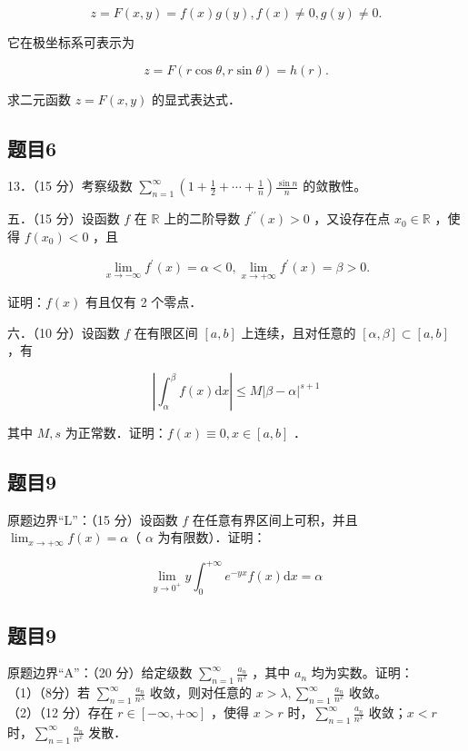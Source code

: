 \documentclass{article}
\begin{document}
\[
z=F(x, y)=f(x) g(y), f(x) \neq 0, g(y) \neq 0 .
\]

它在极坐标系可表示为

\[
z=F(r \cos \theta, r \sin \theta)=h(r) .
\]

求二元函数 \(z=F(x, y)\) 的显式表达式．\\

\subsection{题目6}
13．（15 分）考察级数 \(\sum_{n=1}^{\infty}\left(1+\frac{1}{2}+\cdots+\frac{1}{n}\right) \frac{\sin n}{n}\) 的敛散性。

五．（15 分）设函数 \(f\) 在 \(\mathbb{R}\) 上的二阶导数 \(f^{\prime \prime}(x)>0\) ，又设存在点 \(x_{0} \in \mathbb{R}\) ，使得 \(f\left(x_{0}\right)<0\) ，且

\[
\lim _{x \rightarrow-\infty} f^{\prime}(x)=\alpha<0, \lim _{x \rightarrow+\infty} f^{\prime}(x)=\beta>0 .
\]

证明：\(f(x)\) 有且仅有 2 个零点．

六．（10 分）设函数 \(f\) 在有限区间 \([a, b]\) 上连续，且对任意的 \([\alpha, \beta] \subset[a, b]\) ，有

\[
\left|\int_{\alpha}^{\beta} f(x) \mathrm{d} x\right| \leq M|\beta-\alpha|^{s+1}
\]

其中 \(M, s\) 为正常数．证明：\(f(x) \equiv 0, x \in[a, b]\) ．\\

\subsection{题目9}
原题边界“L”：（15 分）设函数 \(f\) 在任意有界区间上可积，并且 \(\lim _{x \rightarrow+\infty} f(x)=\alpha\)（ \(\alpha\) 为有限数）．证明：

\[
\lim _{y \rightarrow 0^{+}} y \int_{0}^{+\infty} e^{-y x} f(x) \mathrm{d} x=\alpha
\]

\subsection{题目9}
原题边界“A”：（20 分）给定级数 \(\sum_{n=1}^{\infty} \frac{a_{n}}{n^{x}}\) ，其中 \(a_{n}\) 均为实数。证明：\\
（1）（8分）若 \(\sum_{n=1}^{\infty} \frac{a_{n}}{n^{\lambda}}\) 收敛，则对任意的 \(x>\lambda, \sum_{n=1}^{\infty} \frac{a_{n}}{n^{x}}\) 收敛。\\
（2）（12 分）存在 \(r \in[-\infty,+\infty]\) ，使得 \(x>r\) 时，\(\sum_{n=1}^{\infty} \frac{a_{n}}{n^{x}}\) 收敛；\(x<r\) 时，\(\sum_{n=1}^{\infty} \frac{a_{n}}{n^{x}}\) 发散．
\end{document}
